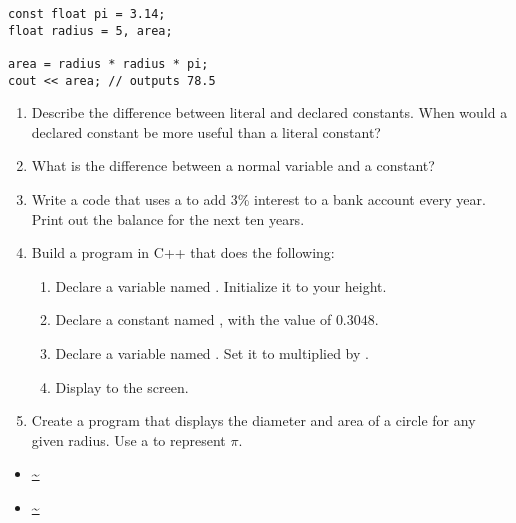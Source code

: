 \noindent\begin{minipage}{\linewidth}\begin{lstlisting}
const float pi = 3.14;
float radius = 5, area;

area = radius * radius * pi;
cout << area; // outputs 78.5
\end{lstlisting}\end{minipage}


\begin{enumerate}
	\item Describe the difference between literal and declared constants. When would a declared constant be more useful than a literal constant?
	\item What is the difference between a normal variable and a constant?
	\item Write a code that uses a  to add 3\% interest to a bank account every year. Print out the balance for the next ten years.
	\item Build a program in C++ that does the following:
	
	\begin{enumerate}
		\item Declare a  variable named . Initialize it to your height.
		\item Declare a  constant named , with the value of $0.3048$.
		\item Declare a  variable named . Set it to  multiplied by .
		\item	Display  to the screen.
	\end{enumerate}

	\item Create a program that displays the diameter and area of a circle for any given radius. Use a  to represent $\pi$. 

\end{enumerate}


\begin{itemize}
\item \url{~}
\item \url{~}
\end{itemize}
